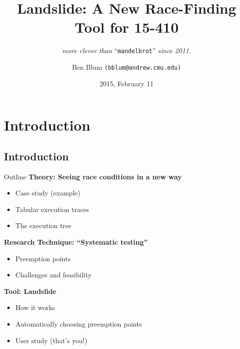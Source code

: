 \documentclass[xcolor=dvipsnames]{beamer}
\title[Landslide]{{\bf Landslide: A New Race-Finding Tool for 15-410}}
\subtitle[]{ {\em more clever than } ``\texttt{mandelbrot}'' {\em since 2011.}}
\author[Ben Blum]{Ben Blum \texttt{(bblum@andrew.cmu.edu)}}
\institute[CMU 15-410]{Carnegie Mellon University - 15-410}
\date[]{2015, February 11}
\begin{document}
\renewcommand{\inserttotalframenumber}{36}
\normalem
\begin{frame}
	\titlepage
\end{frame}


\newcommand\linegap{\vspace{0.2in}}
\newcommand\breakslide[1]{\begin{frame}{} \begin{center} #1 \end{center} \end{frame}}

\section{Introduction}
\subsection{Introduction}

\begin{frame}{Outline}
	\textbf{Theory: Seeing race conditions in a new way}
	\begin{itemize}
		\item Case study (example)
		\item Tabular execution traces
		\item The execution tree
	\end{itemize}
	{\bf Research Technique: ``Systematic testing''}
	\begin{itemize}
		\item Preemption points
		\item Challenges and feasibility
	\end{itemize}
	{\bf Tool: Landslide}
	\begin{itemize}
		\item How it works
		\item Automatically choosing preemption points
		\item User study (that's you!)
	\end{itemize}
\end{frame}
\end{document}
